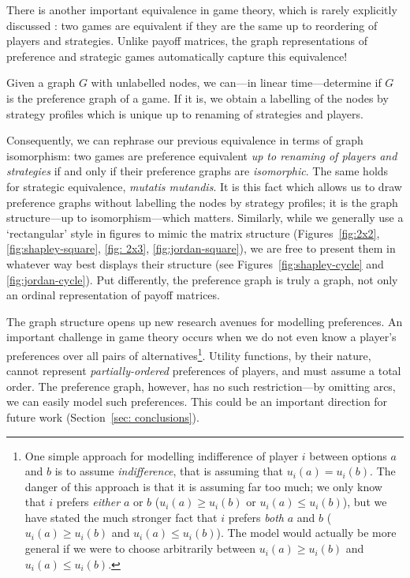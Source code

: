 \documentclass[preprint,authoryear]{elsarticle}
\begin{document}
There is another important equivalence in game theory, which is rarely explicitly discussed \citep{shapley_topics_1964}: two games are equivalent if they are the same up to reordering of players and strategies. Unlike payoff matrices, the graph representations of preference and strategic games automatically capture this equivalence!

\begin{thm} \label{reconstruction theorem}
    Given a graph $G$ with unlabelled nodes, we can---in linear time---determine if $G$ is the preference graph of a game. If it is, we obtain a labelling of the nodes by strategy profiles which is unique up to renaming of strategies and players.
\end{thm}
Consequently, we can rephrase our previous equivalence in terms of graph isomorphism: two games are preference equivalent \emph{up to renaming of players and strategies} if and only if their preference graphs are \emph{isomorphic}. The same holds for strategic equivalence, \emph{mutatis mutandis}. It is this fact which allows us to draw preference graphs without labelling the nodes by strategy profiles; it is the graph structure---up to isomorphism---which matters. Similarly, while we generally use a `rectangular' style in figures to mimic the matrix structure (Figures~\ref{fig:2x2}, \ref{fig:shapley-square}, \ref{fig: 2x3}, \ref{fig:jordan-square}), we are free to present them in whatever way best displays their structure (see Figures~\ref{fig:shapley-cycle} and \ref{fig:jordan-cycle}). Put differently, the preference graph is truly a graph, not only an ordinal representation of payoff matrices.

The graph structure opens up new research avenues for modelling preferences. An important challenge in game theory occurs when we do not even know a player's preferences over all pairs of alternatives\footnote{One simple approach for modelling indifference of player $i$ between options $a$ and $b$ is to assume \emph{indifference}, that is assuming that $u_i(a) = u_i(b)$. The danger of this approach is that it is assuming far too much; we only know that $i$ prefers \emph{either} $a$ or $b$ ($u_i(a)\geq u_i(b)$ or $u_i(a)\leq u_i(b)$), but we have stated the much stronger fact that $i$ prefers \emph{both} $a$ and $b$ ($u_i(a)\geq u_i(b)$ and $u_i(a)\leq u_i(b)$). The model would actually be more general if we were to choose arbitrarily between $u_i(a)\geq u_i(b)$ and $u_i(a)\leq u_i(b)$.}. Utility functions, by their nature, cannot represent \emph{partially-ordered} preferences of players, and must assume a total order. The preference graph, however, has no such restriction---by omitting arcs, we can easily model such preferences. This could be an important direction for future work (Section~\ref{sec: conclusions}).
\end{document}
